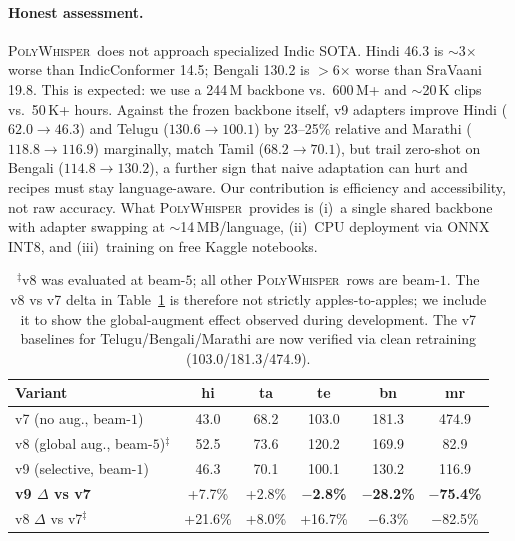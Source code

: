 \documentclass[11pt,a4paper]{article}
\newcommand{\poly}{\textsc{PolyWhisper}}
\begin{document}
\paragraph{Honest assessment.}
\poly\ does not approach specialized Indic SOTA.
Hindi 46.3 is $\sim$3$\times$ worse than IndicConformer 14.5; Bengali 130.2 is $>$6$\times$ worse than SraVaani 19.8.
This is expected: we use a 244\,M backbone vs.\ 600\,M+ and $\sim$20\,K clips vs.\ 50\,K+ hours.
Against the frozen backbone itself, v9 adapters improve Hindi ($62.0\to46.3$) and Telugu ($130.6\to100.1$) by 23--25\% relative and Marathi ($118.8\to116.9$) marginally, match Tamil ($68.2\to70.1$), but trail zero-shot on Bengali ($114.8\to130.2$), a further sign that naive adaptation can hurt and recipes must stay language-aware.
Our contribution is efficiency and accessibility, not raw accuracy.
What \poly\ provides is (i)~a single shared backbone with adapter swapping at $\sim$14\,MB/language, (ii)~CPU deployment via ONNX INT8, and (iii)~training on free Kaggle notebooks.

\begin{table}[t]
  \centering
  \caption{Augmentation ablation (FLEURS WER, normalized). Deltas are computed within Table~\ref{tab:main}'s reported numbers; the v8 delta mixes beams ($^\ddagger$) and is shown for context.}
  \label{tab:ablation}
  \small
  \begin{tabular}{lccccc}
    \toprule
    Variant & hi & ta & te & bn & mr \\
    \midrule
    v7 (no aug., beam-$1$)    & 43.0 & 68.2 & 103.0 & 181.3 & 474.9 \\
    v8 (global aug., beam-$5$)$^\ddagger$ & 52.5 & 73.6 & 120.2 & 169.9 & 82.9  \\
    v9 (selective, beam-$1$)  & 46.3 & 70.1 & 100.1 & 130.2 & 116.9  \\
    \midrule
    \textbf{v9 $\Delta$ vs v7} & +7.7\% & +2.8\% & \textbf{$-$2.8\%} & \textbf{$-$28.2\%} & \textbf{$-$75.4\%} \\
    v8 $\Delta$ vs v7$^\ddagger$ & +21.6\% & +8.0\% & +16.7\% & $-$6.3\% & $-$82.5\% \\
    \bottomrule
  \end{tabular}
  \vspace{1pt}
  \caption*{\footnotesize $^\ddagger$v8 was evaluated at beam-$5$; all other \poly\ rows are beam-$1$. The v8 vs v7 delta in Table~\ref{tab:ablation} is therefore not strictly apples-to-apples; we include it to show the global-augment effect observed during development. The v7 baselines for Telugu/Bengali/Marathi are now verified via clean retraining (103.0/181.3/474.9).}
\end{table}
\end{document}
